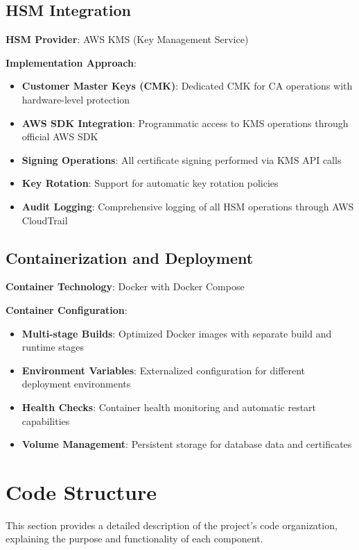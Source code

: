 \subsection{HSM Integration}

\textbf{HSM Provider}: AWS KMS (Key Management Service)

\textbf{Implementation Approach}:

\begin{itemize}
    \item \textbf{Customer Master Keys (CMK)}: Dedicated CMK for CA operations with hardware-level protection
    \item \textbf{AWS SDK Integration}: Programmatic access to KMS operations through official AWS SDK
    \item \textbf{Signing Operations}: All certificate signing performed via KMS API calls
    \item \textbf{Key Rotation}: Support for automatic key rotation policies
    \item \textbf{Audit Logging}: Comprehensive logging of all HSM operations through AWS CloudTrail
\end{itemize}

\subsection{Containerization and Deployment}

\textbf{Container Technology}: Docker with Docker Compose

\textbf{Container Configuration}:

\begin{itemize}
    \item \textbf{Multi-stage Builds}: Optimized Docker images with separate build and runtime stages
    \item \textbf{Environment Variables}: Externalized configuration for different deployment environments
    \item \textbf{Health Checks}: Container health monitoring and automatic restart capabilities
    \item \textbf{Volume Management}: Persistent storage for database data and certificates
\end{itemize}

\section{Code Structure}

This section provides a detailed description of the project's code organization, explaining the purpose and functionality of each component.


